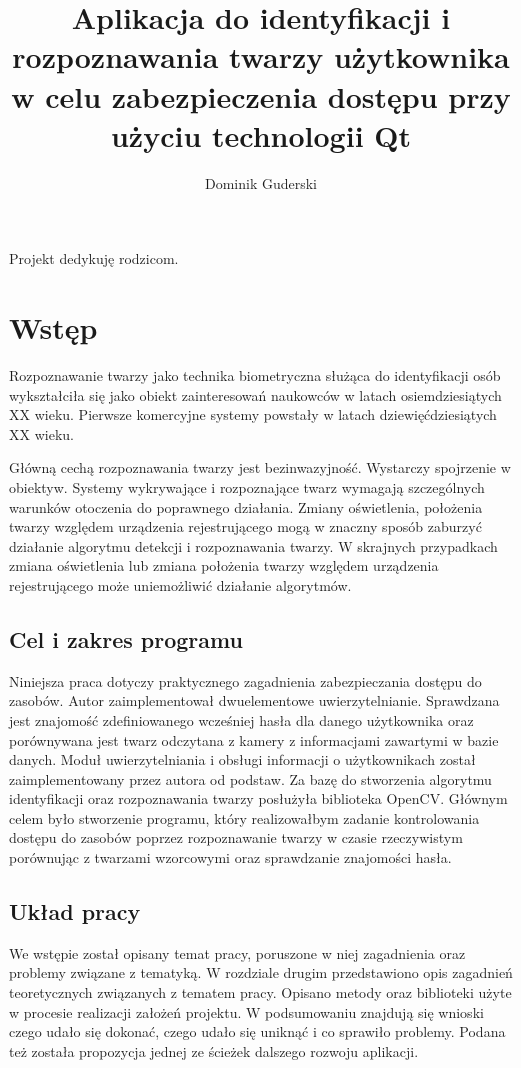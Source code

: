 \documentclass[eng,printmode]{mgr}
\title{Aplikacja do identyfikacji i rozpoznawania twarzy użytkownika w celu zabezpieczenia dostępu przy użyciu technologii Qt}
\author{Dominik Guderski}
\begin{document}


\maketitle
\dedication{6cm}{Projekt dedykuję rodzicom.}

\tableofcontents


\chapter{Wstęp}
Rozpoznawanie twarzy jako technika biometryczna służąca do identyfikacji osób wykształciła się jako obiekt zainteresowań naukowców w latach osiemdziesiątych XX wieku. Pierwsze komercyjne systemy powstały w latach dziewięćdziesiątych XX wieku\cite{historyreco}.

Główną cechą rozpoznawania twarzy jest bezinwazyjność. Wystarczy spojrzenie w obiektyw. Systemy wykrywające i rozpoznające twarz wymagają szczególnych warunków otoczenia do poprawnego działania. Zmiany oświetlenia, położenia twarzy względem urządzenia rejestrującego mogą w znaczny sposób zaburzyć działanie algorytmu detekcji i rozpoznawania twarzy. W skrajnych przypadkach zmiana oświetlenia lub zmiana położenia twarzy względem urządzenia rejestrującego może uniemożliwić działanie algorytmów.
\section{Cel i zakres programu}

Niniejsza praca dotyczy praktycznego zagadnienia zabezpieczania dostępu do zasobów. Autor zaimplementował dwuelementowe uwierzytelnianie. Sprawdzana jest znajomość zdefiniowanego wcześniej hasła dla danego użytkownika oraz porównywana jest twarz odczytana z kamery z informacjami zawartymi w bazie danych. Moduł uwierzytelniania i obsługi informacji o użytkownikach został zaimplementowany przez autora od podstaw. Za bazę do stworzenia algorytmu identyfikacji oraz rozpoznawania twarzy posłużyła biblioteka OpenCV. Głównym celem było stworzenie programu, który realizowałbym zadanie kontrolowania dostępu do zasobów poprzez rozpoznawanie twarzy w czasie rzeczywistym porównując z twarzami wzorcowymi oraz sprawdzanie znajomości hasła.

\section{Układ pracy}

We wstępie został opisany temat pracy, poruszone w niej zagadnienia oraz problemy związane z tematyką. W rozdziale drugim przedstawiono opis zagadnień teoretycznych związanych z tematem pracy. Opisano metody oraz biblioteki użyte w procesie realizacji założeń projektu. W podsumowaniu znajdują się wnioski czego udało się dokonać, czego udało się uniknąć i co sprawiło problemy. Podana też została propozycja jednej ze ścieżek dalszego rozwoju aplikacji.
\end{document}
